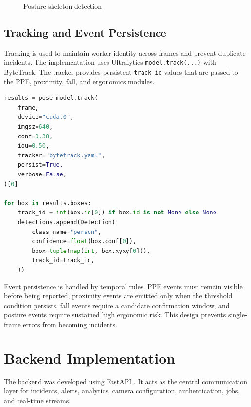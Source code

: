 \begin{figure}[H]
\centering
{}
\caption{Posture skeleton detection}
\end{figure}

\subsection{Tracking and Event Persistence}

Tracking is used to maintain worker identity across frames and prevent duplicate incidents. The implementation uses Ultralytics \texttt{model.track(...)} with ByteTrack. The tracker provides persistent \texttt{track\_id} values that are passed to the PPE, proximity, fall, and ergonomics modules.

\begin{lstlisting}[language=Python,caption={ByteTrack initialization and ID assignment},label={lst:tracking}]
results = pose_model.track(
    frame,
    device="cuda:0",
    imgsz=640,
    conf=0.38,
    iou=0.50,
    tracker="bytetrack.yaml",
    persist=True,
    verbose=False,
)[0]

for box in results.boxes:
    track_id = int(box.id[0]) if box.id is not None else None
    detections.append(Detection(
        class_name="person",
        confidence=float(box.conf[0]),
        bbox=tuple(map(int, box.xyxy[0])),
        track_id=track_id,
    ))
\end{lstlisting}

Event persistence is handled by temporal rules. PPE events must remain visible before being reported, proximity events are emitted only when the threshold condition persists, fall events require a candidate confirmation window, and posture events require sustained high ergonomic risk. This design prevents single-frame errors from becoming incidents.

\section{Backend Implementation}

The backend was developed using FastAPI \cite{fastapi_docs}. It acts as the central communication layer for incidents, alerts, analytics, camera configuration, authentication, jobs, and real-time streams.


